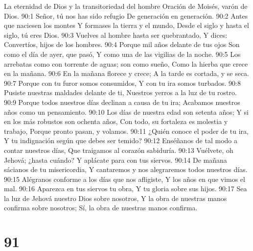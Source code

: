 La eternidad de Dios y la transitoriedad del hombre 
Oración de Moisés, varón de Dios. 
90:1 Señor, tú nos has sido refugio 
De generación en generación. 
90:2 Antes que naciesen los montes 
Y formases la tierra y el mundo, 
Desde el siglo y hasta el siglo, tú eres Dios. 
90:3 Vuelves al hombre hasta ser quebrantado, 
Y dices: Convertíos, hijos de los hombres. 
90:4 Porque mil años delante de tus ojos 
Son como el día de ayer, que pasó, 
Y como una de las vigilias de la noche. 
90:5 Los arrebatas como con torrente de aguas; son como sueño, 
Como la hierba que crece en la mañana. 
90:6 En la mañana florece y crece; 
A la tarde es cortada, y se seca. 
90:7 Porque con tu furor somos consumidos, 
Y con tu ira somos turbados. 
90:8 Pusiste nuestras maldades delante de ti, 
Nuestros yerros a la luz de tu rostro. 
90:9 Porque todos nuestros días declinan a causa de tu ira; 
Acabamos nuestros años como un pensamiento. 
90:10 Los días de nuestra edad son setenta años; 
Y si en los más robustos son ochenta años, 
Con todo, su fortaleza es molestia y trabajo, 
Porque pronto pasan, y volamos. 
90:11 ¿Quién conoce el poder de tu ira, 
Y tu indignación según que debes ser temido? 
90:12 Enséñanos de tal modo a contar nuestros días, 
Que traigamos al corazón sabiduría. 
90:13 Vuélvete, oh Jehová; ¿hasta cuándo? 
Y aplácate para con tus siervos. 
90:14 De mañana sácianos de tu misericordia, 
Y cantaremos y nos alegraremos todos nuestros días. 
90:15 Alégranos conforme a los días que nos afligiste, 
Y los años en que vimos el mal. 
90:16 Aparezca en tus siervos tu obra, 
Y tu gloria sobre sus hijos. 
90:17 Sea la luz de Jehová nuestro Dios sobre nosotros, 
Y la obra de nuestras manos confirma sobre nosotros; 
Sí, la obra de nuestras manos confirma. 

\chapter{91}


